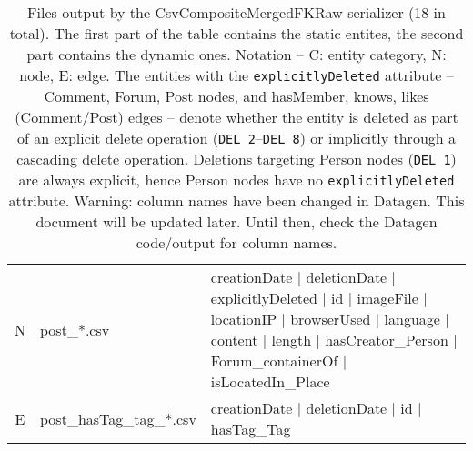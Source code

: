 \begin{table}[htb]
{\begin{tabular}{|c|l|l|}
            \hline
            N                    & post\_*.csv                          & creationDate | deletionDate | explicitlyDeleted | id | imageFile | locationIP | browserUsed | language | content | length | hasCreator\_Person | Forum\_containerOf | isLocatedIn\_Place \\
            E                    & post\_hasTag\_tag\_*.csv             & creationDate | deletionDate | id | hasTag\_Tag                                                                                                                                           \\
            \hline
        \end{tabular}}
    \caption{Files output by the CsvCompositeMergedFKRaw serializer (18 in total). The first part of the table contains the static entites, the second part contains the dynamic ones. Notation -- C: entity category, N: node, E: edge.
        The entities with the \texttt{explicitlyDeleted} attribute -- Comment, Forum, Post nodes, and hasMember, knows, likes (Comment/Post) edges -- denote whether the entity is deleted as part of an explicit delete operation (\texttt{DEL 2}--\texttt{DEL 8}) or implicitly through a cascading delete operation. Deletions targeting Person nodes (\texttt{DEL 1}) are always explicit, hence Person nodes have no \texttt{explicitlyDeleted} attribute.
        Warning: column names have been changed in Datagen. This document will be updated later. Until then, check the Datagen code/output for column names.
        }
    \label{table:csv-raw}
\end{table}
